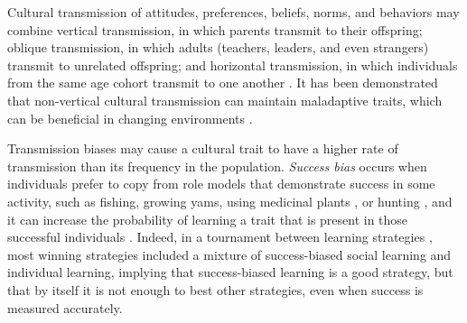\documentclass[12pt]{extarticle}
\begin{document}
Cultural transmission {of attitudes, preferences, beliefs, norms, and behaviors} may combine vertical transmission, in which parents transmit to their offspring; oblique transmission, in which adults (teachers, leaders, and even strangers) transmit to unrelated offspring; and horizontal transmission, in which {individuals} from the same age cohort transmit to one another \citep{transmissionVectorsBook}.
It has been demonstrated that non-vertical cultural transmission can maintain maladaptive traits, which can be beneficial in changing environments \citep{changeEnv,Lehmann2009}. 

Transmission biases may cause a cultural trait to have a {higher rate of transmission than} its frequency in the population. \textit{Success bias} occurs when individuals prefer to copy from role models that demonstrate success in some activity, such as fishing, growing yams, using medicinal plants \citep{fijian_social_bias}, or hunting \citep{Mesoudi2008}, and it can increase the probability of learning a {trait that is present in those successful individuals} \citep{Borofsky2022}. 
Indeed, in a tournament between learning strategies  \citep{strategiesPaper}, most {winning} strategies included a mixture of success-biased social learning and individual learning, implying that success-biased learning is a good strategy, but that by itself it is not enough to best other strategies, even when success is measured accurately.
\end{document}
